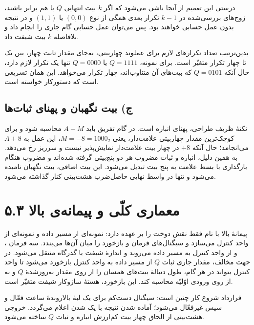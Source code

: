 \documentclass[12pt,a4paper]{article}
\begin{document}
	درستی این تعمیم از آنجا ناشی می‌شود که اگر \(k\) بیت انتهایی \(Q\) با هم برابر باشند، زوج‌های بررسی‌شده در \(k-1\) تکرار بعدی همگی از نوع \((0,0)\) یا \((1,1)\) و در نتیجه بدون عمل حسابی خواهند بود. پس می‌توان عمل حسابی گام جاری را انجام داد و بلافاصله \(k\) بیت شیفت داد.

	بدین‌ترتیب تعداد تکرارهای لازم برای عملوند چهاربیتی، به‌جای مقدار ثابت چهار، بین یک تا چهار تکرار متغیّر است. برای نمونه، \(Q=1111\) یا \(Q=0000\) تنها یک تکرار لازم دارد، حال آنکه \(Q=0101\) که بیت‌های آن متناوب‌اند، چهار تکرار می‌خواهد. این همان تسریعی است که دستورکار خواسته است.

	\subsection*{ج) بیت نگهبان و پهنای ثبات‌ها}
	نکتهٔ ظریف طراحی، پهنای انباره است. در گام تفریق باید \(A-M\) محاسبه شود و برای کوچک‌ترین مقدار چهاربیتی علامت‌دار، یعنی \(M=-8=1000_2\)، این عمل به \(A+8\) می‌انجامد؛ حال آنکه \(+8\) در چهار بیت علامت‌دار نمایش‌پذیر نیست و سرریز رخ می‌دهد. به همین دلیل، انباره و ثبات مضروب هر دو پنج‌بیتی گرفته شده‌اند و مضروب هنگام بارگذاری با بسط علامت به پنج بیت تبدیل می‌شود. این بیت اضافی، بیت نگهبان نامیده می‌شود و تنها در واسط نهایی حاصل‌ضرب هشت‌بیتی کنار گذاشته می‌شود.

	\section*{۵.۳ معماری کلّی و پیمانه‌ی بالا}
	پیمانهٔ بالا با نام  فقط نقش دوخت را بر عهده دارد: نمونه‌ای از مسیر داده و نمونه‌ای از واحد کنترل می‌سازد و سیگنال‌های فرمان و بازخورد را میان آن‌ها می‌بندد. سه فرمان ،  و  از واحد کنترل به مسیر داده می‌روند و اندازهٔ شیفت با گذرگاه  منتقل می‌شود. در جهت مخالف، مقدار جاری ثبات \(Q\) از مسیر داده به واحد کنترل بازخورد می‌شود تا واحد کنترل بتواند در هر گام، طول دنبالهٔ بیت‌های همسان را از روی مقدار به‌روزشدهٔ \(Q\) و نه از روی ورودی اوّلیّه محاسبه کند. این بازخورد، هستهٔ سازوکار شیفت متغیّر است.

	قرارداد شروع کار چنین است: سیگنال  دست‌کم برای یک لبهٔ بالاروندهٔ ساعت فعّال و سپس غیرفعّال می‌شود؛ آماده شدن نتیجه با یک شدن  اعلام می‌گردد. خروجی هشت‌بیتی  از الحاق چهار بیت کم‌ارزش انباره و ثبات \(Q\) ساخته می‌شود.

\end{document}
